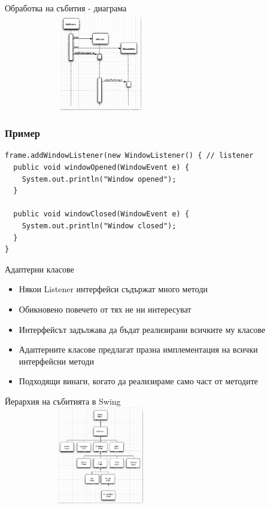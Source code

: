 \documentclass{beamer}
\begin{document}
\begin{frame}{Обработка на събития - диаграма}
  \transdissolve
  \includegraphics[width=320px,height=160px]{images/event_handling.png}  
\end{frame}

\begin{frame}[fragile]
  \frametitle{Пример}
  \transdissolve
\begin{lstlisting}
frame.addWindowListener(new WindowListener() { // listener
  public void windowOpened(WindowEvent e) {
    System.out.println("Window opened"); 
  }
  
  public void windowClosed(WindowEvent e) {
    System.out.println("Window closed"); 
  }
}

\end{lstlisting}
\end{frame}

\begin{frame}{Адаптерни класове}
  \transdissolve
  \begin{itemize}
  \item Някои Listener интерфейси съдържат много методи
  \item Обикновено повечето от тях не ни интересуват
  \item Интерфейсът задължава да бъдат реализирани всичките му класове
  \item Адаптерните класове предлагат празна имплементация на всички
    интерфейсни методи
  \item Подходящи винаги, когато да реализираме само част от методите
  \end{itemize}
\end{frame}


\begin{frame}{Йерархия на събитията в Swing}
  \transdissolve
  \includegraphics[width=320px,height=160px]{images/events.png}  
\end{frame}
\end{document}
